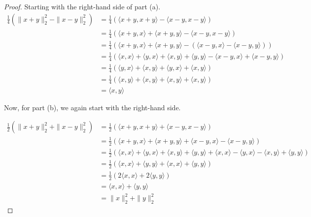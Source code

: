 \documentclass{amsart}
\begin{document}
    \begin{proof}
    Starting with the right-hand side of part (a).
    \begin{align*}
    \frac{1}{4} (\| x + y \|_2^2 - \|x - y\|_2^2) &=  \frac{1}{4}(\langle x+y,x+y\rangle - \langle x-y,x-y \rangle) \\
    &= \frac{1}{4}(\langle x+y,x\rangle + \langle x+y,y\rangle - \langle x-y,x-y \rangle) \\
    &= \frac{1}{4}(\langle x+y,x\rangle + \langle x+y,y\rangle - (\langle x-y,x \rangle - \langle x-y,y \rangle )) \\
    &= \frac{1}{4}(\langle x,x\rangle + \langle y,x\rangle + \langle x,y\rangle + \langle y,y\rangle - \langle x-y,x \rangle + \langle x-y,y \rangle ) \\
    &= \frac{1}{4}(\langle y,x\rangle + \langle x,y\rangle + \langle y,x \rangle + \langle x,y \rangle) \\
    &= \frac{1}{4}(\langle x,y\rangle + \langle x,y\rangle + \langle x,y \rangle + \langle x,y \rangle) \\
    &= \langle x,y \rangle
    \end{align*}
    
    Now, for part (b), we again start with the right-hand side.
    
    \begin{align*}
    \frac{1}{2} (\|x + y\|_2^2 + \|x - y\|_2^2) &= \frac{1}{2} (\langle x+y,x+y \rangle + \langle x-y,x-y \rangle) \\
    &= \frac{1}{2} (\langle x+y,x \rangle + \langle x+y,y \rangle + \langle x-y,x \rangle - \langle x-y,y \rangle) \\
    &= \frac{1}{2} (\langle x,x \rangle + \langle y,x \rangle + \langle x,y \rangle + \langle y,y \rangle + \langle x,x \rangle - \langle y,x \rangle - \langle x,y \rangle + \langle y,y \rangle) \\
    &= \frac{1}{2} (\langle x,x \rangle+ \langle y,y \rangle + \langle x,x \rangle + \langle y,y \rangle) \\
    &= \frac{1}{2} ( 2\langle x,x \rangle + 2\langle y,y \rangle) \\
    &= \langle x,x \rangle + \langle y,y \rangle \\
    &= \|x\|_2^2 + \|y\|_2^2
    \end{align*}

    \end{proof}
\end{document}
